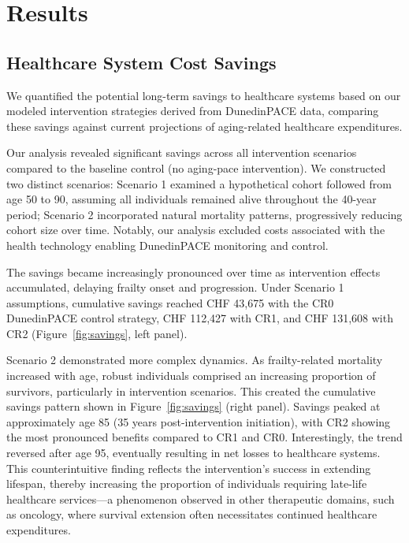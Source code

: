 \section{Results}

\subsection{Healthcare System Cost Savings}

We quantified the potential long-term savings to healthcare systems based on our modeled intervention strategies derived from DunedinPACE data, comparing these savings against current projections of aging-related healthcare expenditures.

Our analysis revealed significant savings across all intervention scenarios compared to the baseline control (no aging-pace intervention). We constructed two distinct scenarios: Scenario 1 examined a hypothetical cohort followed from age 50 to 90, assuming all individuals remained alive throughout the 40-year period; Scenario 2 incorporated natural mortality patterns, progressively reducing cohort size over time. Notably, our analysis excluded costs associated with the health technology enabling DunedinPACE monitoring and control.

The savings became increasingly pronounced over time as intervention effects accumulated, delaying frailty onset and progression. Under Scenario 1 assumptions, cumulative savings reached CHF 43,675 with the CR0 DunedinPACE control strategy, CHF 112,427 with CR1, and CHF 131,608 with CR2 (Figure~\ref{fig:savings}, left panel).

Scenario 2 demonstrated more complex dynamics. As frailty-related mortality increased with age, robust individuals comprised an increasing proportion of survivors, particularly in intervention scenarios. This created the cumulative savings pattern shown in Figure~\ref{fig:savings} (right panel). Savings peaked at approximately age 85 (35 years post-intervention initiation), with CR2 showing the most pronounced benefits compared to CR1 and CR0. Interestingly, the trend reversed after age 95, eventually resulting in net losses to healthcare systems. This counterintuitive finding reflects the intervention's success in extending lifespan, thereby increasing the proportion of individuals requiring late-life healthcare services—a phenomenon observed in other therapeutic domains, such as oncology, where survival extension often necessitates continued healthcare expenditures.

